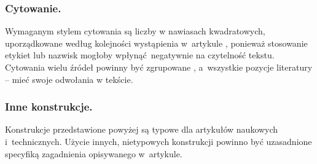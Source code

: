 \subsubsection{Cytowanie.}
\label{subsubsec:cite}

Wymaganym stylem cytowania są liczby w nawiasach kwadratowych, uporządkowane według kolejności wystąpienia w~artykule \cite{ref:lncs}, ponieważ stosowanie etykiet lub nazwisk mogłoby wpłynąć negatywnie na czytelność tekstu. Cytowania wielu źródeł powinny być zgrupowane \cite{ref:lncs,ref:latex}, a~wszystkie pozycje literatury -- mieć swoje odwołania w tekście.

\subsubsection{Inne konstrukcje.}
\label{subsubsec:others}

Konstrukcje przedstawione powyżej są typowe dla artykułów naukowych i~technicznych. Użycie innych, nietypowych konstrukcji powinno być uzasadnione specyfiką zagadnienia opisywanego w~artykule.
